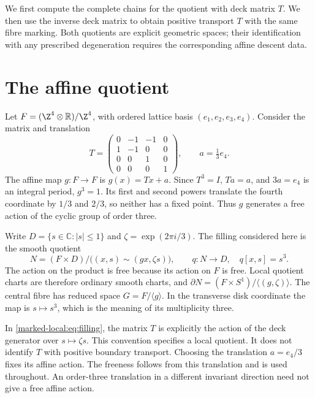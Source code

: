 We first compute the complete chains for the quotient with deck
matrix $T$. We then use the inverse deck matrix to obtain positive
transport $T$ with the same fibre marking. Both quotients are
explicit geometric spaces; their identification with any prescribed
degeneration requires the corresponding affine descent data.


\section{The affine quotient}

Let $F=(\Z^4\otimes\mathbb R)/\Z^4$, with ordered lattice basis
$(e_1,e_2,e_3,e_4)$. Consider the matrix and translation
\begin{equation}\label{marked-local:eq:native-data}
 T=\begin{pmatrix}
 0&-1&-1&0\\1&-1&0&0\\0&0&1&0\\0&0&0&1
 \end{pmatrix},\qquad a=\tfrac13e_4.
\end{equation}
The affine map $g:F\to F$ is $g(x)=Tx+a$.
Since $T^3=I$, $Ta=a$, and $3a=e_4$ is an integral period,
$g^3=1$. Its first and second powers translate the fourth coordinate
by $1/3$ and $2/3$, so neither has a fixed point. Thus $g$ generates
a free action of the cyclic group of order three.

Write $D=\{s\in\mathbb C:|s|\le1\}$ and
$\zeta=\exp(2\pi i/3)$. The filling considered here is the smooth
quotient
\begin{equation}\label{marked-local:eq:filling}
 N=(F\times D)/\bigl((x,s)\sim(gx,\zeta s)\bigr),
 \qquad q:N\longrightarrow D,\quad q[x,s]=s^3.
\end{equation}
The action on the product is free because its action on $F$ is free.
Local quotient charts are therefore ordinary smooth charts, and
$\partial N=(F\times S^1)/\langle(g,\zeta)\rangle$.
The central fibre has reduced space $G=F/\langle g\rangle$.
In the transverse disk coordinate the map is $s\mapsto s^3$, which
is the meaning of its multiplicity three.

In \eqref{marked-local:eq:filling}, the matrix $T$ is explicitly the action of
the deck generator over $s\mapsto\zeta s$. This convention specifies
a local quotient. It does not identify $T$ with positive boundary
transport. Choosing the translation $a=e_4/3$ fixes its affine action. The freeness follows from this
translation and is used throughout. An order-three translation in a
different invariant direction need not give a free affine action.

